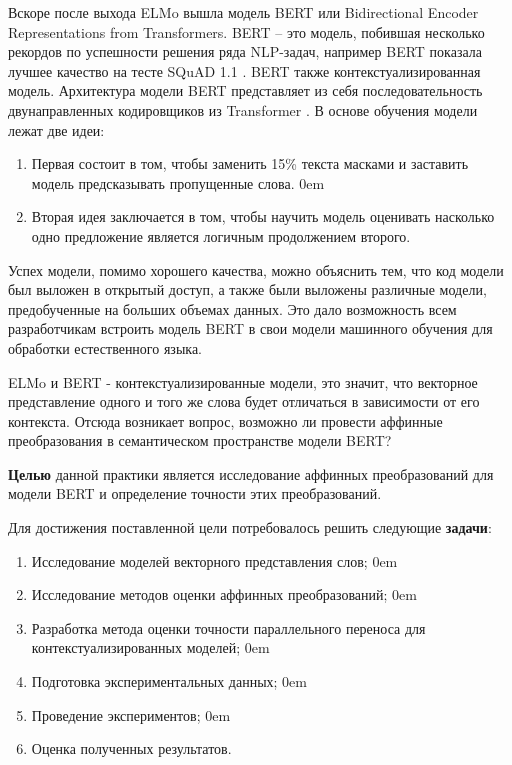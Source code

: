 \documentclass[a4paper,14pt]{article}
\begin{document}
Вскоре после выхода ELMo вышла модель BERT \cite{bert1} или Bidirectional Encoder Representations from Transformers.
BERT – это модель, побившая несколько рекордов по успешности решения ряда NLP-задач, например BERT показала лучшее качество на тесте SQuAD 1.1 \cite{squad}.
BERT также контекстуализированная модель.
Архитектура модели BERT представляет из себя последовательность двунаправленных кодировщиков из Transformer \cite{attention}.
В основе обучения модели лежат две идеи:

\begin{enumerate}
	\itemsep0em 
	\item Первая состоит в том, чтобы заменить 15\% текста масками и заставить модель предсказывать пропущенные слова.
	\itemsep0em 
	\item Вторая идея заключается в том, чтобы научить модель оценивать насколько одно предложение является логичным продолжением второго.
\end{enumerate}

Успех модели, помимо хорошего качества, можно объяснить тем, что код модели был выложен в открытый доступ, а также были выложены различные модели, предобученные на больших объемах данных.
Это дало возможность всем разработчикам встроить модель BERT в свои модели машинного обучения для обработки естественного языка.

ELMo и BERT - контекстуализированные модели, это значит, что векторное представление одного и того же слова будет отличаться в зависимости от его контекста.
Отсюда возникает вопрос, возможно ли провести аффинные преобразования в семантическом пространстве модели BERT?

\textbf{Целью} данной практики является исследование аффинных преобразований для модели BERT и определение точности этих преобразований.

Для достижения поставленной цели потребовалось решить следующие \textbf{задачи}:

\begin{enumerate}
	\itemsep0em 
	\item Исследование моделей векторного представления слов;
		\itemsep0em 
	\item Исследование методов оценки аффинных преобразований;
		\itemsep0em 
	\item Разработка метода оценки точности параллельного переноса для контекстуализированных моделей;
		\itemsep0em 
	\item Подготовка экспериментальных данных;
		\itemsep0em 
	\item Проведение экспериментов;
		\itemsep0em 
	\item Оценка полученных результатов.

\end{enumerate}
\end{document}
